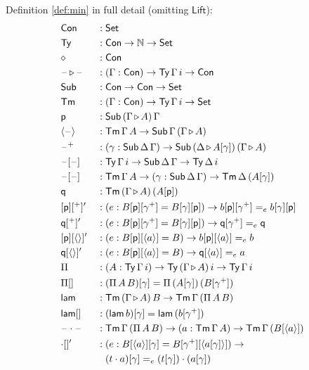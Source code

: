 \documentclass[sigplan,10pt,anonymous,review]{acmart}\settopmatter{printfolios=true,printccs=false,printacmref=false}
\newcommand{\ra}{\rightarrow}
\newcommand{\Set}{\mathsf{Set}}
\newcommand{\Ty}{\mathsf{Ty}}
\newcommand{\Tm}{\mathsf{Tm}}
\newcommand{\Con}{\mathsf{Con}}
\newcommand{\Sub}{\mathsf{Sub}}
\newcommand{\p}{\mathsf{p}}
\newcommand{\q}{\mathsf{q}}
\newcommand{\ext}{\mathop{\triangleright}}
\newcommand{\N}{\mathbb{N}}
\newcommand{\lam}{\mathsf{lam}}
\newcommand{\blank}{\mathord{\hspace{1pt}\text{--}\hspace{1pt}}} %
\newcommand{\Lift}{\mathsf{Lift}}
\begin{document}
Definition \ref{def:min} in full detail (omitting $\Lift$):
\begin{alignat*}{10}
  & \Con && : \Set \\
  & \Ty && : \Con\ra\N\ra\Set \\
  & \diamond && : \Con \\
  & \blank\ext\blank && : (\Gamma:\Con)\ra\Ty\,\Gamma\,i\ra\Con \\
  & \Sub && : \Con\ra\Con\ra\Set \\
  & \Tm && : (\Gamma:\Con)\ra\Ty\,\Gamma\,i\ra\Set \\
  & \p && : \Sub\,(\Gamma\ext A)\,\Gamma \\
  & \langle\blank\rangle && : \Tm\,\Gamma\,A\ra\Sub\,\Gamma\,(\Gamma\ext A) \\
  & \blank^+ && : (\gamma:\Sub\,\Delta\,\Gamma)\ra\Sub\,(\Delta\ext A[\gamma])\,(\Gamma\ext A) \\
  & \blank[\blank] && : \Ty\,\Gamma\,i\ra\Sub\,\Delta\,\Gamma\ra\Ty\,\Delta\,i \\
  & \blank[\blank] && : \Tm\,\Gamma\,A\ra(\gamma:\Sub\,\Delta\,\Gamma)\ra\Tm\,\Delta\,(A[\gamma]) \\
  & \q && : \Tm\,(\Gamma\ext A)\,(A[\p]) \\
  & [\p][^+]' && : (e:B[\p][\gamma^+] = B[\gamma][\p])\ra b[\p][\gamma^+] =_e b[\gamma][\p] \\
  & \q[^+]' && : (e:B[\p][\gamma^+] = B[\gamma][\p])\ra \q[\gamma^+] =_e \q \\
  & [\p][\langle\rangle]' && : (e:B[\p][\langle a\rangle] = B)\ra b[\p ][\langle a\rangle] =_e b \\
  & \q[\langle\rangle]' && : (e:B[\p][\langle a\rangle] = B)\ra \q[\langle a\rangle] =_e a \\
  & \Pi && : (A:\Ty\,\Gamma\,i)\ra\Ty\,(\Gamma\ext A)\,i\ra\Ty\,\Gamma\,i \\
  & \Pi[] && : (\Pi\,A\,B)[\gamma] = \Pi\,(A[\gamma])\,(B[\gamma^+]) \\
  & \lam && : \Tm\,(\Gamma\ext A)\,B\ra\Tm\,\Gamma\,(\Pi\,A\,B) \\
  & \lam[] && : (\lam\,b)[\gamma] = \lam\,(b[\gamma^+]) \\
  & \blank\cdot\blank && : \Tm\,\Gamma\,(\Pi\,A\,B)\ra(a:\Tm\,\Gamma\,A)\ra\Tm\,\Gamma\,(B[\langle a\rangle]) \\
  & {\cdot}[]' && : (e:B[\langle a\rangle][\gamma] = B[\gamma^+][\langle a[\gamma]\rangle])\ra \\
  & && \hphantom{{}:{}} (t\cdot a)[\gamma] =_e (t[\gamma])\cdot(a[\gamma]) \\

\end{alignat*}
\end{document}
